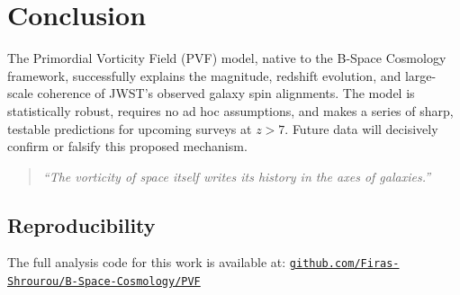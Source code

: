 \documentclass{BSpacePaper} %
\begin{document}
\section{Conclusion}
The Primordial Vorticity Field (PVF) model, native to the B-Space Cosmology framework, successfully explains the magnitude, redshift evolution, and large-scale coherence of JWST's observed galaxy spin alignments. The model is statistically robust, requires no ad hoc assumptions, and makes a series of sharp, testable predictions for upcoming surveys at $z>7$. Future data will decisively confirm or falsify this proposed mechanism.

\begin{quote}
\textit{“The vorticity of space itself writes its history in the axes of galaxies.”}
\end{quote}

\subsection*{Reproducibility}
The full analysis code for this work is available at:
\href{https://github.com/Firas-Shrourou/B-Space-Cosmology/PVF}{\texttt{github.com/Firas-Shrourou/B-Space-Cosmology/PVF}}
\end{document}
